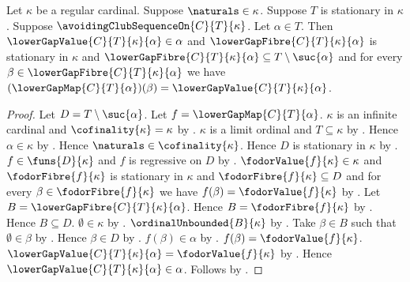 \begin{theorem}\label{lower_gap_value_and_fibre_properties}
    Let $\kappa$ be a regular cardinal.
    Suppose $\naturals\in\kappa$.
    Suppose $T$ is stationary in $\kappa$.
    Suppose $\avoidingClubSequenceOn{C}{T}{\kappa}$.
    Let $\alpha\in T$.
    Then $\lowerGapValue{C}{T}{\kappa}{\alpha}\in\alpha$ and
        $\lowerGapFibre{C}{T}{\kappa}{\alpha}$ is stationary in $\kappa$ and
        $\lowerGapFibre{C}{T}{\kappa}{\alpha}
            \subseteq T\setminus\suc{\alpha}$ and
        for every $\beta\in\lowerGapFibre{C}{T}{\kappa}{\alpha}$ we have
            $(\lowerGapMap{C}{T}{\alpha})(\beta)
                =\lowerGapValue{C}{T}{\kappa}{\alpha}$.
\end{theorem}
\begin{proof}
    Let $D=T\setminus\suc{\alpha}$.
    Let $f=\lowerGapMap{C}{T}{\alpha}$.
    $\kappa$ is an infinite cardinal and $\cofinality{\kappa}=\kappa$
        by .
    $\kappa$ is a limit ordinal and $T\subseteq\kappa$
        by .
    Hence $\alpha\in\kappa$ by .
    Hence $\naturals\in\cofinality{\kappa}$.
    Hence $D$ is stationary in $\kappa$
        by .
    $f\in\funs{D}{\kappa}$ and $f$ is regressive on $D$
        by .
    $\fodorValue{f}{\kappa}\in\kappa$ and
        $\fodorFibre{f}{\kappa}$ is stationary in $\kappa$ and
        $\fodorFibre{f}{\kappa}\subseteq D$ and
        for every $\beta\in\fodorFibre{f}{\kappa}$ we have
            $f(\beta)=\fodorValue{f}{\kappa}$
        by .
    Let $B=\lowerGapFibre{C}{T}{\kappa}{\alpha}$.
    Hence $B=\fodorFibre{f}{\kappa}$
        by .
    Hence $B\subseteq D$.
    $\emptyset\in\kappa$ by .
    $\ordinalUnbounded{B}{\kappa}$ by .
    Take $\beta\in B$ such that $\emptyset\in\beta$
        by .
    Hence $\beta\in D$ by .
    $f(\beta)\in\alpha$ by .
    $f(\beta)=\fodorValue{f}{\kappa}$.
    $\lowerGapValue{C}{T}{\kappa}{\alpha}=\fodorValue{f}{\kappa}$
        by .
    Hence $\lowerGapValue{C}{T}{\kappa}{\alpha}\in\alpha$.
    Follows by .
\end{proof}

